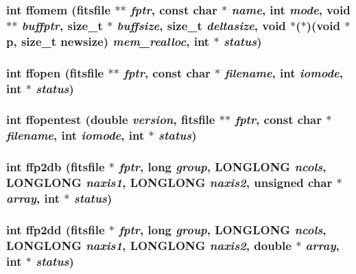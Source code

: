 \subsubsection{\setlength{\rightskip}{0pt plus 5cm}int ffomem (\bf{fitsfile} $\ast$$\ast$ {\em fptr}, const char $\ast$ {\em name}, int {\em mode}, void $\ast$$\ast$ {\em buffptr}, size\_\-t $\ast$ {\em buffsize}, size\_\-t {\em deltasize}, void $\ast$($\ast$)(void $\ast$p, size\_\-t newsize) {\em mem\_\-realloc}, int $\ast$ {\em status})}\label{fitsio_8h_d76715975f2022594bbce821ab9d5d81}


\subsubsection{\setlength{\rightskip}{0pt plus 5cm}int ffopen (\bf{fitsfile} $\ast$$\ast$ {\em fptr}, const char $\ast$ {\em filename}, int {\em iomode}, int $\ast$ {\em status})}\label{fitsio_8h_c42982e168064c85aefcc72de41d1ce9}


\subsubsection{\setlength{\rightskip}{0pt plus 5cm}int ffopentest (double {\em version}, \bf{fitsfile} $\ast$$\ast$ {\em fptr}, const char $\ast$ {\em filename}, int {\em iomode}, int $\ast$ {\em status})}\label{fitsio_8h_9c71ba8e466791b2eac6de1ca9848f4c}


\subsubsection{\setlength{\rightskip}{0pt plus 5cm}int ffp2db (\bf{fitsfile} $\ast$ {\em fptr}, long {\em group}, \bf{LONGLONG} {\em ncols}, \bf{LONGLONG} {\em naxis1}, \bf{LONGLONG} {\em naxis2}, unsigned char $\ast$ {\em array}, int $\ast$ {\em status})}\label{fitsio_8h_8e43e1cab4a5cdaa87d44ed10bd52298}


\subsubsection{\setlength{\rightskip}{0pt plus 5cm}int ffp2dd (\bf{fitsfile} $\ast$ {\em fptr}, long {\em group}, \bf{LONGLONG} {\em ncols}, \bf{LONGLONG} {\em naxis1}, \bf{LONGLONG} {\em naxis2}, double $\ast$ {\em array}, int $\ast$ {\em status})}\label{fitsio_8h_8add04b815d7489f9beeb3dd43857843}


